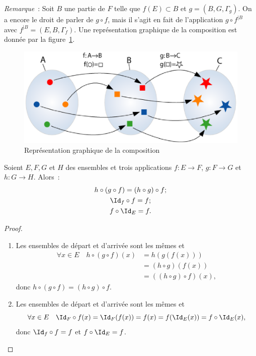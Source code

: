 \emph{Remarque}~: Soit $B$ une partie de $F$ telle que $f(E) \subset B$ et $g=(B,G,\Gamma_g)$. On a encore le droit de parler de $g \circ f$, mais il s'agit en fait de l'application $g \circ f^{|B}$ avec $ f^{|B} =(E,B,\Gamma_f)$.
Une représentation graphique de la composition est donnée par la figure~\ref{chap3-fig:compose}.
%
\begin{figure}
  \centering
  \includegraphics[scale=0.7]{compose.eps}
  \caption{Représentation graphique de la composition}
  \label{chap3-fig:compose}
\end{figure}
%
\begin{prop}
  Soient $E,F,G$ et $H$ des ensembles et trois applications $f:E \longrightarrow F$, $g:F \longrightarrow G$ et $h:G \longrightarrow H$. Alors~:
  \begin{gather}
  h \circ (g \circ f)=(h \circ g) \circ f;\\
  \Id_f \circ f = f;\\
  f \circ \Id_E=f.
  \end{gather}
\end{prop}
\begin{proof}
  \begin{enumerate}
  \item Les ensembles de départ et d'arrivée sont les mêmes et 
    \begin{align}
      \forall x \in E \quad h \circ (g \circ f)(x) &=h(g(f(x))) \\ 
      &=(h \circ g)(f(x)) \\ 
      &=((h \circ g) \circ f)(x),
    \end{align}
    donc $h \circ (g \circ f)=(h \circ g) \circ f$.
  \item Les ensembles de départ et d'arrivée sont les mêmes et 
    \begin{equation}
      \forall x \in E \quad \Id_F \circ f(x)=\Id_F(f(x))=f(x)=f(\Id_E(x))=f \circ \Id_E(x),
    \end{equation}
    donc $\Id_f \circ f = f$ et $f \circ \Id_E=f$.
  \end{enumerate}
\end{proof}

